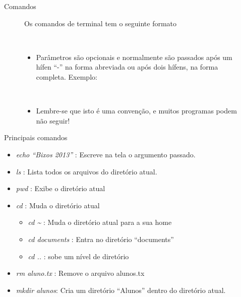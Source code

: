\documentclass{beamer}
\begin{document}
\begin{frame}{Comandos}
    \begin{figure}[h]
        \centering
        Os comandos de terminal tem o seguinte formato \newline \\
        \begin{shell}
        \end{shell}
        \\
        \begin{itemize}
        \item Parâmetros são opcionais e normalmente são passados após um hífen
          ``-'' na forma abreviada ou após dois hífens, na forma completa.
          Exemplo:
        \end{itemize}
        \begin{shell}
        \end{shell}
        \\
        \begin{itemize}
        \item{Lembre-se que isto é uma convenção, e muitos programas podem não
          seguir!}
        \end{itemize}
    \end{figure}
\end{frame}

\begin{frame}{Principais comandos}
   \begin{itemize}
   \item \emph{echo ``Bixos 2013''} : Escreve na tela o argumento passado.
   \item \emph{ls} : Lista todos os arquivos do diretório atual.
   \item \emph{pwd} : Exibe o diretório atual
   \item \emph{cd} : Muda o diretório atual
     \begin{itemize}
     \item \emph{cd \~{}} : Muda o diretório atual para a sua home
     \item \emph{cd documents} : Entra no diretório ``documents''
     \item \emph{cd ..} : sobe um nível de diretório
     \end{itemize}
   \item \emph{rm aluno.tx} : Remove o arquivo alunos.tx
   \item \emph{mkdir alunos}: Cria um diretório ``Alunos'' dentro do
     diretório atual.
   \end{itemize}
\end{frame}
\end{document}
